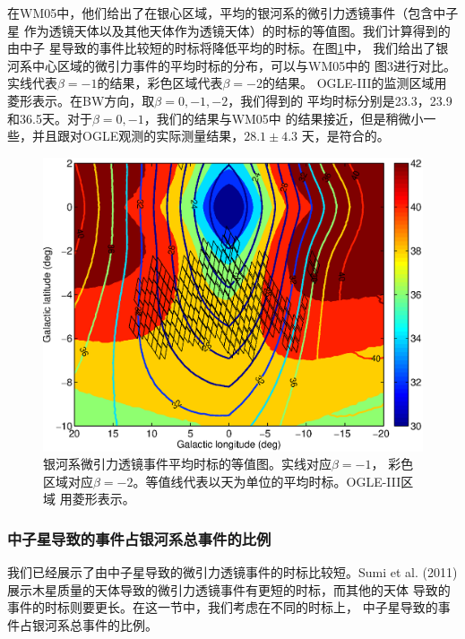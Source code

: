 在WM05中，他们给出了在银心区域，平均的银河系的微引力透镜事件（包含中子星
作为透镜天体以及其他天体作为透镜天体）的时标的等值图。我们计算得到的由中子
星导致的事件比较短的时标将降低平均的时标。在图\ref{map_timescale}中，
我们给出了银河系中心区域的微引力事件的平均时标的分布，可以与WM05中的
图3进行对比。实线代表$\beta=-1$的结果，彩色区域代表$\beta=-2$的结果。
OGLE-III的监测区域用菱形表示。在BW方向，取$\beta=0,-1,-2$，我们得到的
平均时标分别是23.3，23.9和36.5天。对于$\beta=0,-1$，我们的结果与WM05中
的结果接近，但是稍微小一些，并且跟对OGLE观测的实际测量结果，$28.1\pm4.3$
天\supercite{sumi}，是符合的。

%
\begin{figure}
\begin{center}
  \includegraphics[width=4 in,trim=0 0 0 3cm]{map_timescale.eps}
%
\caption{银河系微引力透镜事件平均时标的等值图。实线对应$\beta=-1$，
彩色区域对应$\beta=-2$。等值线代表以天为单位的平均时标。OGLE-III区域
用菱形表示。}
\label{map_timescale}
\end{center}
\end{figure}
%

\subsubsection{中子星导致的事件占银河系总事件的比例}

我们已经展示了由中子星导致的微引力透镜事件的时标比较短。Sumi et al. (2011)\supercite{sumi11}
展示木星质量的天体导致的微引力透镜事件有更短的时标，而其他的天体
导致的事件的时标则要更长。在这一节中，我们考虑在不同的时标上，
中子星导致的事件占银河系总事件的比例。

